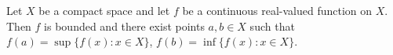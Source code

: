 Let $X$ be a compact space and let $f$ be a continuous real-valued function on $X$. Then $f$ is bounded and there exist points $a, b \in X$ such that $f(a) = \sup\{f(x) : x \in X\}$, $f(b) = \inf\{f(x) : x \in X\}$.
